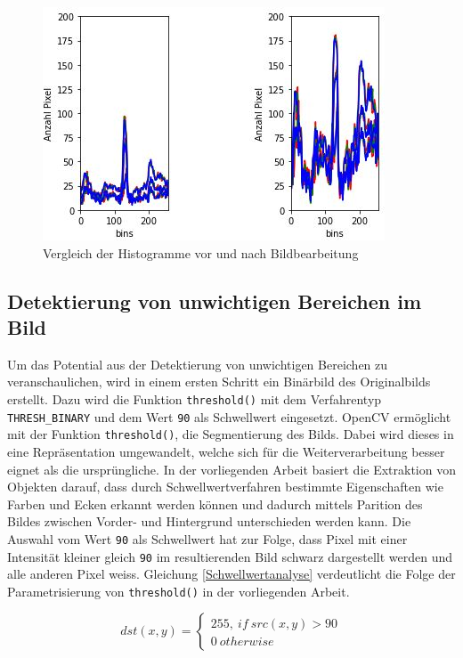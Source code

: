 \begin{figure}[H]
	\center
	\includegraphics[scale=0.9]{Grafiken/entwicklung/2HistrogrammVergleich.jpg}
	\caption{Vergleich der Histogramme vor und nach Bildbearbeitung} 
	\label{fig: Vergleich der Histogramme vor und nach Bildbearbeitung}
\end{figure}

\subsection{Detektierung von unwichtigen Bereichen im Bild}
Um das Potential aus der Detektierung von unwichtigen Bereichen zu veranschaulichen, wird in einem ersten Schritt ein Binärbild des Originalbilds erstellt. Dazu wird die Funktion \texttt{threshold()} mit dem Verfahrentyp \texttt{THRESH_BINARY} und dem Wert \texttt{90} als Schwellwert eingesetzt. OpenCV ermöglicht mit der Funktion \texttt{threshold()}, die Segmentierung des Bilds. Dabei wird dieses in eine Repräsentation umgewandelt, welche sich für die Weiterverarbeitung besser eignet als die ursprüngliche. \cite[S.328-335]{FernandezVillan2019} In der vorliegenden Arbeit basiert die Extraktion von Objekten darauf, dass durch Schwellwertverfahren bestimmte Eigenschaften wie Farben und Ecken erkannt werden können und dadurch mittels Parition des Bildes zwischen Vorder- und Hintergrund unterschieden werden kann. Die Auswahl vom Wert \texttt{90} als Schwellwert hat zur Folge, dass Pixel mit einer Intensität kleiner gleich \texttt{90} im resultierenden Bild schwarz dargestellt werden und alle anderen Pixel weiss. Gleichung \ref{Schwellwertanalyse} verdeutlicht die Folge der Parametrisierung von \texttt{threshold()} in der vorliegenden Arbeit. 

\begin{equation}\label{Schwellwertanalyse}
dst(x,y) =\begin{cases}
255,\: if \: src(x,y) > 90\\
0\: otherwise
\end{cases}
\end{equation}

